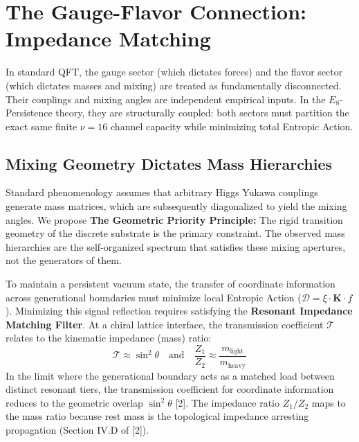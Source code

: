 
\section{The Gauge-Flavor Connection: Impedance Matching}

In standard QFT, the gauge sector (which dictates forces) and the flavor sector (which dictates masses and mixing) are treated as fundamentally disconnected. Their couplings and mixing angles are independent empirical inputs. In the $E_8$-Persistence theory, they are structurally coupled: both sectors must partition the exact same finite $\nu=16$ channel capacity while minimizing total Entropic Action.

\subsection{Mixing Geometry Dictates Mass Hierarchies}

Standard phenomenology assumes that arbitrary Higgs Yukawa couplings generate mass matrices, which are subsequently diagonalized to yield the mixing angles. We propose \textbf{The Geometric Priority Principle:} The rigid transition geometry of the discrete substrate is the primary constraint. The observed mass hierarchies are the self-organized spectrum that satisfies these mixing apertures, not the generators of them.

To maintain a persistent vacuum state, the transfer of coordinate information across generational boundaries must minimize local Entropic Action ($\mathcal{D} = \xi \cdot \mathbf{K} \cdot f$). Minimizing this signal reflection requires satisfying the \textbf{Resonant Impedance Matching Filter}. At a chiral lattice interface, the transmission coefficient $\mathcal{T}$ relates to the kinematic impedance (mass) ratio:
\begin{equation}
    \mathcal{T} \approx \sin^2 \theta \quad \text{and} \quad \frac{Z_1}{Z_2} \approx \frac{m_{\text{light}}}{m_{\text{heavy}}}
\end{equation}
In the limit where the generational boundary acts as a matched load between distinct resonant tiers, the transmission coefficient for coordinate information reduces to the geometric overlap $\sin^2\theta$ [2]. The impedance ratio $Z_1/Z_2$ maps to the mass ratio because rest mass is the topological impedance arresting propagation (Section IV.D of [2]).

